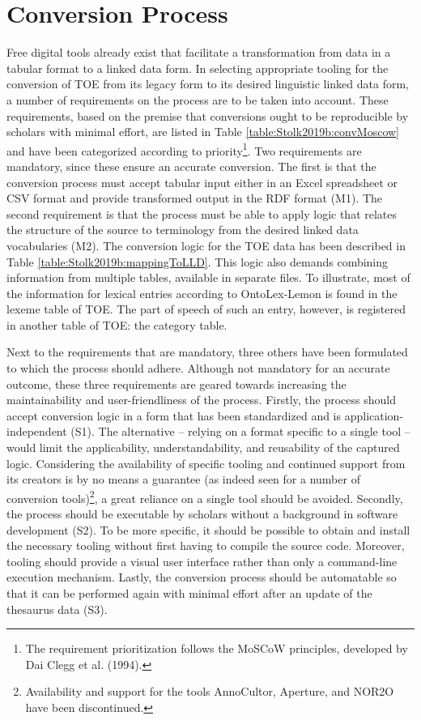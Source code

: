 \section{Conversion Process}
Free digital tools already exist that facilitate a transformation from data in a tabular format to a linked data form. In selecting appropriate tooling for the conversion of TOE from its legacy form to its desired linguistic linked data form, a number of requirements on the process are to be taken into account. These requirements, based on the premise that conversions ought to be reproducible by scholars with minimal effort, are listed in Table \ref{table:Stolk2019b:convMoscow} and have been categorized according to priority\footnote{The requirement prioritization follows the MoSCoW principles, developed by Dai Clegg et al. (1994).}. Two requirements are mandatory, since these ensure an accurate conversion. The first is that the conversion process must accept tabular input either in an Excel spreadsheet or CSV format and provide transformed output in the RDF format (M1). The second requirement is that the process must be able to apply logic that relates the structure of the source to terminology from the desired linked data vocabularies (M2). The conversion logic for the TOE data has been described in Table \ref{table:Stolk2019b:mappingToLLD}. This logic also demands combining information from multiple tables, available in separate files. To illustrate, most of the information for lexical entries according to OntoLex-Lemon is found in the lexeme table of TOE. The part of speech of such an entry, however, is registered in another table of TOE: the category table. 

Next to the requirements that are mandatory, three others have been formulated to which the process should adhere. Although not mandatory for an accurate outcome, these three requirements are geared towards increasing the maintainability and user-friendliness of the process. Firstly, the process should accept conversion logic in a form that has been standardized and is application-independent (S1). The alternative – relying on a format specific to a single tool – would limit the applicability, understandability, and reusability of the captured logic. Considering the availability of specific tooling and continued support from its creators is by no means a guarantee (as indeed seen for a number of conversion tools)\footnote{Availability and support for the tools AnnoCultor, Aperture, and NOR2O have been discontinued.}, a great reliance on a single tool should be avoided. Secondly, the process should be executable by scholars without a background in software development (S2). To be more specific, it should be possible to obtain and install the necessary tooling without first having to compile the source code. Moreover, tooling should provide a visual user interface rather than only a command-line execution mechanism. Lastly, the conversion process should be automatable so that it can be performed again with minimal effort after an update of the thesaurus data (S3).

